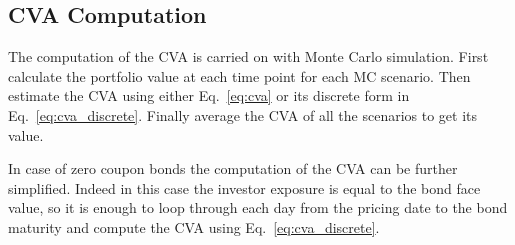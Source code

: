 \subsection{CVA Computation}

The computation of the CVA is carried on with Monte Carlo simulation. 
First calculate the portfolio value at each time point for each MC scenario. Then estimate the CVA using either Eq.~\ref{eq:cva} or its discrete form in Eq.~\ref{eq:cva_discrete}. Finally average the CVA of all the scenarios to get its value.

In case of zero coupon bonds the computation of the CVA can be further simplified. Indeed in this case the investor exposure is equal to the bond face value, so it is enough to loop through each day from the pricing date to the bond maturity and compute the CVA using Eq.~\ref{eq:cva_discrete}.

